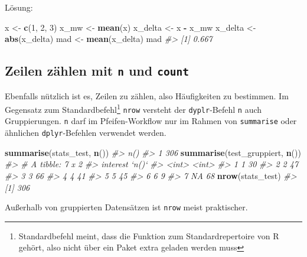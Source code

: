\documentclass[12pt,ngerman,]{book}
\makeatletter
\newenvironment{Shaded}{\begin{snugshade}}{\end{snugshade}}
\newcommand{\KeywordTok}[1]{\textcolor[rgb]{0.13,0.29,0.53}{\textbf{#1}}}
\newcommand{\DecValTok}[1]{\textcolor[rgb]{0.00,0.00,0.81}{#1}}
\newcommand{\StringTok}[1]{\textcolor[rgb]{0.31,0.60,0.02}{#1}}
\newcommand{\CommentTok}[1]{\textcolor[rgb]{0.56,0.35,0.01}{\textit{#1}}}
\newcommand{\OperatorTok}[1]{\textcolor[rgb]{0.81,0.36,0.00}{\textbf{#1}}}
\newcommand{\NormalTok}[1]{#1}
\let\rmarkdownfootnote\footnote%
\def\footnote{\protect\rmarkdownfootnote}
\newenvironment{kframe}{%
\medskip{}
\setlength{\fboxsep}{.8em}
 \def\at@end@of@kframe{}%
 \ifinner\ifhmode%
  \def\at@end@of@kframe{\end{minipage}}%
  \begin{minipage}{\columnwidth}%
 \fi\fi%
 \def\FrameCommand##1{\hskip\@totalleftmargin \hskip-\fboxsep
 \colorbox{shadecolor}{##1}\hskip-\fboxsep
     \hskip-\linewidth \hskip-\@totalleftmargin \hskip\columnwidth}%
 \MakeFramed {\advance\hsize-\width
   \@totalleftmargin\z@ \linewidth\hsize
   \@setminipage}}%
 {\par\unskip\endMakeFramed%
 \at@end@of@kframe}
\renewenvironment{Shaded}{\begin{kframe}}{\end{kframe}}
\theoremstyle{definition}
\theoremstyle{definition}
\theoremstyle{remark}
\makeatother
\begin{document}
Lösung:

\begin{Shaded}
\begin{Highlighting}[]
\NormalTok{x <-}\StringTok{ }\KeywordTok{c}\NormalTok{(}\DecValTok{1}\NormalTok{, }\DecValTok{2}\NormalTok{, }\DecValTok{3}\NormalTok{)}
\NormalTok{x_mw <-}\StringTok{ }\KeywordTok{mean}\NormalTok{(x)}
\NormalTok{x_delta <-}\StringTok{ }\NormalTok{x }\OperatorTok{-}\StringTok{ }\NormalTok{x_mw}
\NormalTok{x_delta <-}\StringTok{ }\KeywordTok{abs}\NormalTok{(x_delta)}
\NormalTok{mad <-}\StringTok{ }\KeywordTok{mean}\NormalTok{(x_delta)}
\NormalTok{mad}
\CommentTok{#> [1] 0.667}
\end{Highlighting}
\end{Shaded}

\subsection{\texorpdfstring{Zeilen zählen mit \texttt{n} und
\texttt{count}}{Zeilen zählen mit n und count}}\label{zeilen-zahlen-mit-n-und-count}

Ebenfalls nützlich ist es, Zeilen zu zählen, also Häufigkeiten zu
bestimmen. Im Gegensatz zum Standardbefehl\footnote{Standardbefehl
  meint, dass die Funktion zum Standardrepertoire von R gehört, also
  nicht über ein Paket extra geladen werden muss} \texttt{nrow} versteht
der \texttt{dyplr}-Befehl \texttt{n} auch Gruppierungen.
\texttt{n} darf im Pfeifen-Workflow nur im Rahmen von \texttt{summarise}
oder ähnlichen \texttt{dplyr}-Befehlen verwendet werden.

\begin{Shaded}
\begin{Highlighting}[]
\KeywordTok{summarise}\NormalTok{(stats_test, }\KeywordTok{n}\NormalTok{())}
\CommentTok{#>   n()}
\CommentTok{#> 1 306}
\KeywordTok{summarise}\NormalTok{(test_gruppiert, }\KeywordTok{n}\NormalTok{())}
\CommentTok{#> # A tibble: 7 x 2}
\CommentTok{#>   interest `n()`}
\CommentTok{#>      <int> <int>}
\CommentTok{#> 1        1    30}
\CommentTok{#> 2        2    47}
\CommentTok{#> 3        3    66}
\CommentTok{#> 4        4    41}
\CommentTok{#> 5        5    45}
\CommentTok{#> 6        6     9}
\CommentTok{#> 7       NA    68}
\KeywordTok{nrow}\NormalTok{(stats_test)}
\CommentTok{#> [1] 306}
\end{Highlighting}
\end{Shaded}

Außerhalb von gruppierten Datensätzen ist \texttt{nrow} meist
praktischer.
\end{document}
